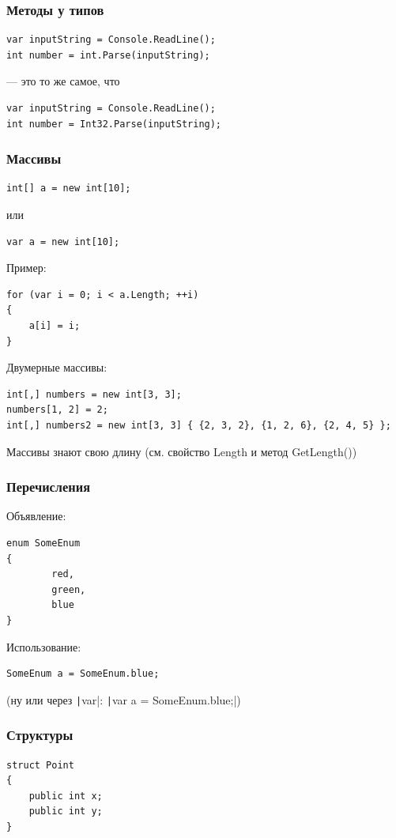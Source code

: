 \documentclass[xetex,mathserif,serif]{beamer}
\begin{document}
    \begin{frame}[fragile]
        \frametitle{Методы у типов}
        \begin{verbatim}
var inputString = Console.ReadLine();
int number = int.Parse(inputString);
        \end{verbatim}
        --- это то же самое, что
        \begin{verbatim}
var inputString = Console.ReadLine();
int number = Int32.Parse(inputString);
        \end{verbatim}
    \end{frame}

    \begin{frame}[fragile]
        \frametitle{Массивы}
        \begin{verbatim}
int[] a = new int[10];
        \end{verbatim}
        или
        \begin{verbatim}
var a = new int[10];
        \end{verbatim}
        Пример:
        \begin{verbatim}
for (var i = 0; i < a.Length; ++i)
{
    a[i] = i;
}
        \end{verbatim}
        Двумерные массивы:
        \begin{verbatim}
int[,] numbers = new int[3, 3];
numbers[1, 2] = 2; 
int[,] numbers2 = new int[3, 3] { {2, 3, 2}, {1, 2, 6}, {2, 4, 5} };
        \end{verbatim}
        Массивы знают свою длину (см. свойство Length и метод GetLength())
    \end{frame}

    \begin{frame}[fragile]
        \frametitle{Перечисления}
        Объявление:
        \begin{verbatim}
enum SomeEnum
{
        red,
        green,
        blue
}
        \end{verbatim}
        Использование:
        \begin{verbatim}
SomeEnum a = SomeEnum.blue;
        \end{verbatim}
        (ну или через \texttt|var|: \texttt|var a = SomeEnum.blue;|)
    \end{frame}

    \begin{frame}[fragile]
        \frametitle{Структуры}
        \begin{verbatim}
struct Point
{
    public int x;
    public int y;
}
        \end{verbatim}
    \end{frame}
\end{document}
